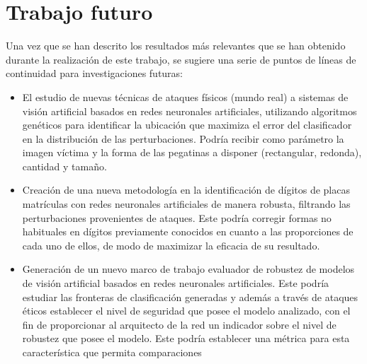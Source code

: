 

\chapter{Trabajo futuro} %

\label{Futuro} %



Una vez que se han descrito los resultados más relevantes que se han obtenido durante la realización de este trabajo, se sugiere una serie de puntos de líneas de continuidad para investigaciones futuras:
\begin{itemize}
    \item El estudio de nuevas técnicas de ataques físicos (mundo real) a sistemas de visión artificial basados en redes neuronales artificiales, utilizando algoritmos genéticos para identificar la ubicación que maximiza el error del clasificador en la distribución de las perturbaciones. Podría recibir como parámetro la imagen víctima y la forma de las pegatinas a disponer (rectangular, redonda), cantidad y tamaño.  
    \item Creación de una nueva metodología en la identificación de dígitos de placas matrículas con redes neuronales artificiales de manera robusta, filtrando las perturbaciones provenientes de ataques. Este podría corregir formas no habituales en dígitos previamente conocidos en cuanto a las proporciones de cada uno de ellos, de modo de maximizar la eficacia de su resultado.
    \item Generación de un nuevo marco de trabajo evaluador de robustez de modelos de visión artificial basados en redes neuronales artificiales. Este podría estudiar las fronteras de clasificación generadas y además a través de ataques éticos establecer el nivel de seguridad que posee el modelo analizado, con el fin de proporcionar al arquitecto de la red un indicador sobre el nivel de robustez que posee el modelo. Este podría establecer una métrica para esta característica que permita comparaciones%
    
\end{itemize}



